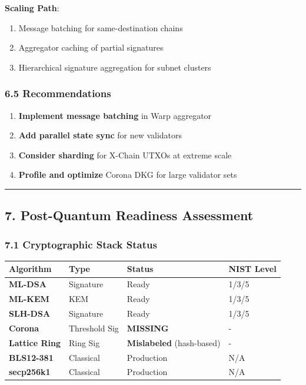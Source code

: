 \documentclass[
]{article}
\newcounter{none} %
\providecommand{\tightlist}{%
  \setlength{\itemsep}{0pt}\setlength{\parskip}{0pt}}
\begin{document}
\textbf{Scaling Path}:

\begin{enumerate}
\def\labelenumi{\arabic{enumi}.}
\tightlist
\item
  Message batching for same-destination chains
\item
  Aggregator caching of partial signatures
\item
  Hierarchical signature aggregation for subnet clusters
\end{enumerate}

\subsubsection{6.5 Recommendations}\label{65-recommendations}

\begin{enumerate}
\def\labelenumi{\arabic{enumi}.}
\tightlist
\item
  \textbf{Implement message batching} in Warp aggregator
\item
  \textbf{Add parallel state sync} for new validators
\item
  \textbf{Consider sharding} for X-Chain UTXOs at extreme scale
\item
  \textbf{Profile and optimize} Corona DKG for large validator sets
\end{enumerate}

\begin{center}\rule{0.5\linewidth}{0.5pt}\end{center}

\subsection{7. Post-Quantum Readiness
Assessment}\label{7-post-quantum-readiness-assessment}

\subsubsection{7.1 Cryptographic Stack
Status}\label{71-cryptographic-stack-status}

{\def\LTcaptype{none} %
\begin{longtable}[]{@{}llll@{}}
\toprule\noalign{}
Algorithm & Type & Status & NIST Level \\
\midrule\noalign{}
\endhead
\bottomrule\noalign{}
\endlastfoot
\textbf{ML-DSA} & Signature & Ready & 1/3/5 \\
\textbf{ML-KEM} & KEM & Ready & 1/3/5 \\
\textbf{SLH-DSA} & Signature & Ready & 1/3/5 \\
\textbf{Corona} & Threshold Sig & \textbf{MISSING} & - \\
\textbf{Lattice Ring} & Ring Sig & \textbf{Mislabeled} (hash-based) &
- \\
\textbf{BLS12-381} & Classical & Production & N/A \\
\textbf{secp256k1} & Classical & Production & N/A \\
\end{longtable}
}
\end{document}
